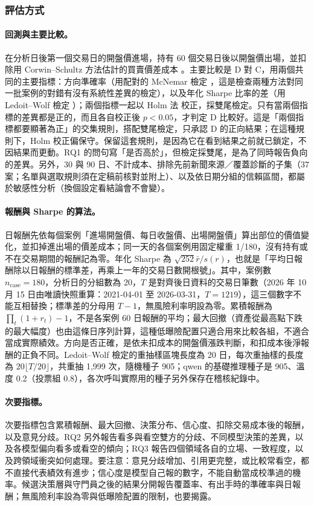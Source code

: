 \documentclass[12pt,a4paper]{article}
\numberwithin{table}{section}
\numberwithin{figure}{section}
\newcommand{\grp}[1]{\textsf{#1}}
\begin{document}
\subsubsection{評估方式}

\paragraph{回測與主要比較。} 在分析日後第一個交易日的開盤價進場，持有 60 個交易日後以開盤價出場，並扣除用 Corwin--Schultz 方法估計的買賣價差成本 \citep{corwin2012spread}。主要比較是 \grp{D} 對 \grp{C}，用兩個共同的主要指標：方向準確率（用配對的 McNemar 檢定 \citep{mcnemar1947}，這是檢查兩種方法對同一批案例的對錯有沒有系統性差異的檢定），以及年化 Sharpe 比率的差（用 Ledoit--Wolf 檢定 \citep{ledoit2008sharpe}）；兩個指標一起以 Holm 法 \citep{holm1979} 校正，採雙尾檢定。只有當兩個指標的差異都是正的，而且各自校正後 $p<0.05$，才判定 \grp{D} 比較好。這是「兩個指標都要顯著為正」的交集規則，搭配雙尾檢定，只承認 \grp{D} 的正向結果；在這種規則下，Holm 校正偏保守。保留這套規則，是因為它在看到結果之前就已鎖定，不因結果而更動。RQ1 的問句寫「是否高於」，但檢定採雙尾，是為了同時報告負向的差異。另外，30 與 90 日、不計成本、排除先前新聞來源／覆蓋診斷的子集（37 案；名單與選取規則須在定稿前核對並附上）、以及依日期分組的信賴區間，都屬於敏感性分析（換個設定看結論會不會變）。

\paragraph{報酬與 Sharpe 的算法。} 日報酬先依每個案例「進場開盤價、每日收盤價、出場開盤價」算出部位的價值變化，並扣掉進出場的價差成本；同一天的各個案例用固定權重 1/180，沒有持有或不在交易期間的報酬記為零。年化 Sharpe 為 $\sqrt{252}\bar r/s(r)$，也就是「平均日報酬除以日報酬的標準差，再乘上一年的交易日數開根號」。其中，案例數 $n_{\mathrm{case}}=180$，分析日的分組數為 20，$T$ 是對齊後日資料的交易日筆數（2026 年 10 月 15 日由唯讀快照重算：2021-04-01 至 2026-03-31，$T=1219$），這三個數字不能互相替換；標準差的分母用 $T-1$，無風險利率明設為零。累積報酬為 $\prod_t(1+r_t)-1$，不是各案例 60 日報酬的平均；最大回撤（資產從最高點下跌的最大幅度）也由這條日序列計算，這種低曝險配置只適合用來比較各組，不適合當成實際績效。方向是否正確，是依未扣成本的開盤價漲跌判斷，和扣成本後淨報酬的正負不同。Ledoit--Wolf 檢定的重抽樣區塊長度為 20 日，每次重抽樣的長度為 $20\lfloor T/20\rfloor$，共重抽 1,999 次，隨機種子 905；qwen 的基礎推理種子是 905、溫度 0.2（投票組 0.8），各次呼叫實際用的種子另外保存在稽核紀錄中。

\paragraph{次要指標。} 次要指標包含累積報酬、最大回撤、決策分布、信心度、扣除交易成本後的報酬，以及意見分歧。RQ2 另外報告看多與看空雙方的分歧、不同模型決策的差異，以及各模型偏向看多或看空的傾向；RQ3 報告四個領域各自的立場、一致程度，以及跨領域衝突如何處理。要注意：意見分歧增加、引用更完整，或比較常看空，都不直接代表績效有進步；信心度是模型自己報的數字，不能自動當成校準過的機率。候選決策層與守門員之後的結果分開報告覆蓋率、有出手時的準確率與日報酬；無風險利率設為零與低曝險配置的限制，也要揭露。
\end{document}
